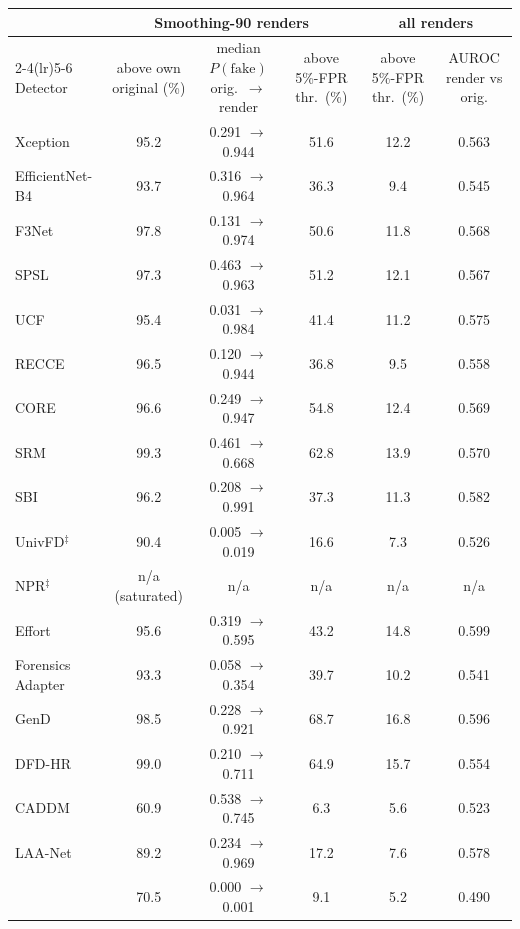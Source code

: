 \begin{tabular}{@{}l ccc cc@{}}
\toprule
 & \multicolumn{3}{c}{Smoothing-90 renders} & \multicolumn{2}{c}{all renders} \\
\cmidrule(lr){2-4}\cmidrule(lr){5-6}
Detector & above own original (\%) & median $P(\text{fake})$ orig.\ $\rightarrow$ render & above 5\%-FPR thr.\ (\%) & above 5\%-FPR thr.\ (\%) & AUROC render vs orig. \\
\midrule
Xception~\cite{xception} & 95.2 & 0.291 $\rightarrow$ 0.944 & 51.6 & 12.2 & 0.563 \\
EfficientNet-B4~\cite{efficientnet} & 93.7 & 0.316 $\rightarrow$ 0.964 & 36.3 & 9.4 & 0.545 \\
F3Net~\cite{f3net} & 97.8 & 0.131 $\rightarrow$ 0.974 & 50.6 & 11.8 & 0.568 \\
SPSL~\cite{spsl} & 97.3 & 0.463 $\rightarrow$ 0.963 & 51.2 & 12.1 & 0.567 \\
UCF~\cite{ucf} & 95.4 & 0.031 $\rightarrow$ 0.984 & 41.4 & 11.2 & 0.575 \\
RECCE~\cite{recce} & 96.5 & 0.120 $\rightarrow$ 0.944 & 36.8 & 9.5 & 0.558 \\
CORE~\cite{core} & 96.6 & 0.249 $\rightarrow$ 0.947 & 54.8 & 12.4 & 0.569 \\
SRM~\cite{srm} & 99.3 & 0.461 $\rightarrow$ 0.668 & 62.8 & 13.9 & 0.570 \\
SBI~\cite{sbi} & 96.2 & 0.208 $\rightarrow$ 0.991 & 37.3 & 11.3 & 0.582 \\
UnivFD$^\ddagger$~\cite{univfd} & 90.4 & 0.005 $\rightarrow$ 0.019 & 16.6 & 7.3 & 0.526 \\
NPR$^\ddagger$~\cite{npr} & n/a (saturated) & n/a & n/a & n/a & n/a \\
Effort~\cite{effort} & 95.6 & 0.319 $\rightarrow$ 0.595 & 43.2 & 14.8 & 0.599 \\
Forensics Adapter~\cite{forensicsadapter} & 93.3 & 0.058 $\rightarrow$ 0.354 & 39.7 & 10.2 & 0.541 \\
GenD~\cite{gend2026} & 98.5 & 0.228 $\rightarrow$ 0.921 & 68.7 & 16.8 & 0.596 \\
DFD-HR~\cite{dfdhr2026} & 99.0 & 0.210 $\rightarrow$ 0.711 & 64.9 & 15.7 & 0.554 \\
CADDM~\cite{caddm} & 60.9 & 0.538 $\rightarrow$ 0.745 & 6.3 & 5.6 & 0.523 \\
LAA-Net~\cite{laanet} & 89.2 & 0.234 $\rightarrow$ 0.969 & 17.2 & 7.6 & 0.578 \\
\midrule
\oursB{} & 70.5 & 0.000 $\rightarrow$ 0.001 & 9.1 & 5.2 & 0.490 \\

\end{tabular}
